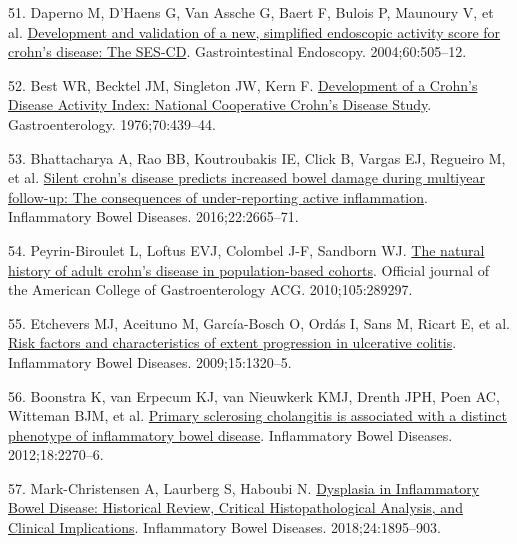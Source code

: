 \documentclass[
  12pt,
  a4paper,
  twoside,
  openright]{book}
\newlength{\cslhangindent}
\newlength{\cslentryspacingunit} %
\newenvironment{CSLReferences}[2] %
 {%
  \setlength{\parindent}{0pt}
  \ifodd #1
  \let\oldpar\par
  \def\par{\hangindent=\cslhangindent\oldpar}
  \fi
  \setlength{\parskip}{#2\cslentryspacingunit}
 }%
 {}
\begin{document}
\begin{CSLReferences}{0}{0}
\leavevmode{}%
51. Daperno M, D'Haens G, Van Assche G, Baert F, Bulois P, Maunoury V, et al. \href{https://doi.org/10.1016/S0016-5107(04)01878-4}{Development and validation of a new, simplified endoscopic activity score for crohn's disease: The SES-CD}. Gastrointestinal Endoscopy. 2004;60:505--12.

\leavevmode{}%
52. Best WR, Becktel JM, Singleton JW, Kern F. \href{https://doi.org/10.1016/S0016-5085(76)80163-1}{Development of a Crohn's Disease Activity Index: National Cooperative Crohn's Disease Study}. Gastroenterology. 1976;70:439--44.

\leavevmode{}%
53. Bhattacharya A, Rao BB, Koutroubakis IE, Click B, Vargas EJ, Regueiro M, et al. \href{https://doi.org/10.1097/MIB.0000000000000935}{Silent crohn's disease predicts increased bowel damage during multiyear follow-up: The consequences of under-reporting active inflammation}. Inflammatory Bowel Diseases. 2016;22:2665--71.

\leavevmode{}%
54. Peyrin-Biroulet L, Loftus EVJ, Colombel J-F, Sandborn WJ. \href{https://doi.org/10.1038/ajg.2009.579}{The natural history of adult crohn's disease in population-based cohorts}. Official journal of the American College of Gastroenterology \textbar{} ACG. 2010;105:289297.

\leavevmode{}%
55. Etchevers MJ, Aceituno M, García-Bosch O, Ordás I, Sans M, Ricart E, et al. \href{https://doi.org/10.1002/ibd.20897}{Risk factors and characteristics of extent progression in ulcerative colitis}. Inflammatory Bowel Diseases. 2009;15:1320--5.

\leavevmode{}%
56. Boonstra K, van Erpecum KJ, van Nieuwkerk KMJ, Drenth JPH, Poen AC, Witteman BJM, et al. \href{https://doi.org/10.1002/ibd.22938}{Primary sclerosing cholangitis is associated with a distinct phenotype of inflammatory bowel disease}. Inflammatory Bowel Diseases. 2012;18:2270--6.

\leavevmode{}%
57. Mark-Christensen A, Laurberg S, Haboubi N. \href{https://doi.org/10.1093/ibd/izy075}{Dysplasia in Inflammatory Bowel Disease: Historical Review, Critical Histopathological Analysis, and Clinical Implications}. Inflammatory Bowel Diseases. 2018;24:1895--903.


\end{CSLReferences}
\end{document}

